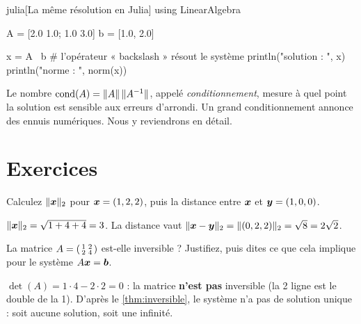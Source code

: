\begin{code}{julia}[La même résolution en Julia]
using LinearAlgebra

A = [2.0 1.0; 1.0 3.0]
b = [1.0, 2.0]

x = A \ b            # l'opérateur « backslash » résout le système
println("solution : ", x)
println("norme    : ", norm(x))
\end{code}

\begin{plusloin}
Le nombre $\operatorname{cond}(A) = \lVert A\rVert\,\lVert{A}^{-1}\rVert$, appelé
\emph{conditionnement}, mesure à quel point la solution est sensible aux
erreurs d'arrondi. Un grand conditionnement annonce des ennuis numériques.
Nous y reviendrons en détail.
\end{plusloin}

\section*{Exercices}

\begin{exercice}
Calculez $\lVert\bm{x}\rVert_2$ pour $\bm{x} = (1, 2, 2)$, puis la distance
entre $\bm{x}$ et $\bm{y} = (1, 0, 0)$.
\end{exercice}

\begin{solution}
$\lVert\bm{x}\rVert_2 = \sqrt{1 + 4 + 4} = 3$. La distance vaut
$\lVert\bm{x}-\bm{y}\rVert_2 = \lVert(0,2,2)\rVert_2 = \sqrt{8} = 2\sqrt{2}$.
\end{solution}

\begin{exercice}[Inversibilité]
La matrice $A = \begin{psmallmatrix} 1 & 2 \\ 2 & 4 \end{psmallmatrix}$
est-elle inversible ? Justifiez, puis dites ce que cela implique pour le
système $A\bm{x} = \bm{b}$.
\end{exercice}

\begin{solution}
$\det(A) = 1\cdot 4 - 2\cdot 2 = 0$ : la matrice \textbf{n'est pas}
inversible (la 2\ieme{} ligne est le double de la 1\iere{}). D'après le
\cref{thm:inversible}, le système n'a pas de solution unique : soit aucune
solution, soit une infinité.
\end{solution}
